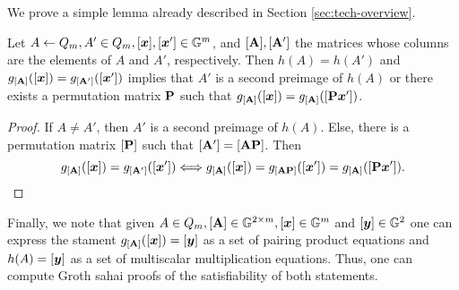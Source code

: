 We prove a simple lemma already described in Section \ref{sec:tech-overview}.
\begin{lemma}\label{lemma:hg}
Let $A\gets Q_m,A'\in Q_m,[{\boldsymbol{x}}],[{\boldsymbol{x}}']\in\mathbb{G}^m$, and $[\mathbf{{A}}],[\mathbf{{A}}']$ the matrices whose columns are the elements of $A$ and $A'$, respectively. Then $h(A)=h(A')$ and $g_{[\mathbf{{A}}]}([{\boldsymbol{x}}])=g_{[\mathbf{{A}}']}([{\boldsymbol{x}}'])$ implies that $A'$ is a second preimage of $h(A)$ or there exists a permutation matrix $\mathbf{{P}}$ such that $g_{[\mathbf{{A}}]}([{\boldsymbol{x}}])=g_{[\mathbf{{A}}]}([\mathbf{{P}}{\boldsymbol{x}}'])$.
\end{lemma}
\begin{proof}
If $A\neq A'$, then $A'$ is a second preimage of $h(A)$. Else, there is a permutation matrix $[\mathbf{{P}}]$ such that $[\mathbf{{A}}'] =[\mathbf{{A}}\mathbf{{P}}]$. Then
$$
 g_{[\mathbf{{A}}]}([{\boldsymbol{x}}])=g_{[\mathbf{{A}}']}([{\boldsymbol{x}}'])\Longleftrightarrow  g_{[\mathbf{{A}}]}([{\boldsymbol{x}}])=g_{[\mathbf{{A}}\mathbf{{P}}]}([{\boldsymbol{x}}'])=g_{[\mathbf{{A}}]}([\mathbf{{P}}{\boldsymbol{x}}']).
$$
\end{proof}

Finally, we note that given $A\in Q_m,[\mathbf{{A}}]\in\mathbb{G}^{2\times m},[{\boldsymbol{x}}]\in\mathbb{G}^m$ and $[{\boldsymbol{y}}]\in\mathbb{G}^2$ one can express the stament $g_{[\mathbf{{A}}]}([{\boldsymbol{x}}])=[{\boldsymbol{y}}]$ as a set of pairing product equations and $h(A)=[{\boldsymbol{y}}]$ as a set of multiscalar multiplication equations. Thus, one can compute Groth sahai proofs of the satisfiability of both statements.
